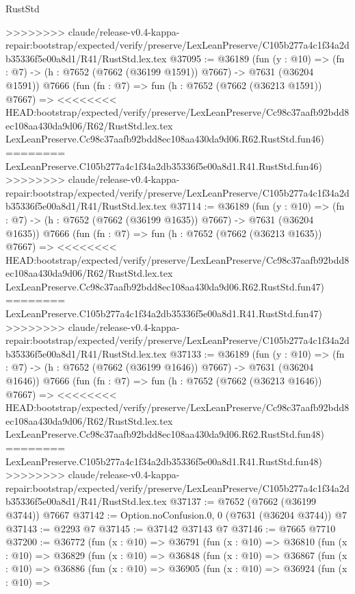 \begin{lexlean}{RustStd}
\begin{coremodule}
{\begin{coremodule}
{{{{{{{{{{{{{{{{{{{{{{{{{{{{{{{{{{{{{{{{{{{{{{{{{{{{{>>>>>>>> claude/release-v0.4-kappa-repair:bootstrap/expected/verify/preserve/LexLeanPreserve/C105b277a4c1f34a2db35336f5e00a8d1/R41/RustStd.lex.tex
@37095 := @36189
    (fun (y : @10) => (fn : @7) -> (h : @7652 (@7662 (@36199 @1591)) @7667) -> @7631 (@36204 @1591))
    @7666
    (fun (fn : @7) =>
    fun (h : @7652 (@7662 (@36213 @1591)) @7667) =>
<<<<<<<< HEAD:bootstrap/expected/verify/preserve/LexLeanPreserve/Cc98c37aafb92bdd8ec108aa430da9d06/R62/RustStd.lex.tex
    LexLeanPreserve.Cc98c37aafb92bdd8ec108aa430da9d06.R62.RustStd.fun46)
========
    LexLeanPreserve.C105b277a4c1f34a2db35336f5e00a8d1.R41.RustStd.fun46)
>>>>>>>> claude/release-v0.4-kappa-repair:bootstrap/expected/verify/preserve/LexLeanPreserve/C105b277a4c1f34a2db35336f5e00a8d1/R41/RustStd.lex.tex
@37114 := @36189
    (fun (y : @10) => (fn : @7) -> (h : @7652 (@7662 (@36199 @1635)) @7667) -> @7631 (@36204 @1635))
    @7666
    (fun (fn : @7) =>
    fun (h : @7652 (@7662 (@36213 @1635)) @7667) =>
<<<<<<<< HEAD:bootstrap/expected/verify/preserve/LexLeanPreserve/Cc98c37aafb92bdd8ec108aa430da9d06/R62/RustStd.lex.tex
    LexLeanPreserve.Cc98c37aafb92bdd8ec108aa430da9d06.R62.RustStd.fun47)
========
    LexLeanPreserve.C105b277a4c1f34a2db35336f5e00a8d1.R41.RustStd.fun47)
>>>>>>>> claude/release-v0.4-kappa-repair:bootstrap/expected/verify/preserve/LexLeanPreserve/C105b277a4c1f34a2db35336f5e00a8d1/R41/RustStd.lex.tex
@37133 := @36189
    (fun (y : @10) => (fn : @7) -> (h : @7652 (@7662 (@36199 @1646)) @7667) -> @7631 (@36204 @1646))
    @7666
    (fun (fn : @7) =>
    fun (h : @7652 (@7662 (@36213 @1646)) @7667) =>
<<<<<<<< HEAD:bootstrap/expected/verify/preserve/LexLeanPreserve/Cc98c37aafb92bdd8ec108aa430da9d06/R62/RustStd.lex.tex
    LexLeanPreserve.Cc98c37aafb92bdd8ec108aa430da9d06.R62.RustStd.fun48)
========
    LexLeanPreserve.C105b277a4c1f34a2db35336f5e00a8d1.R41.RustStd.fun48)
>>>>>>>> claude/release-v0.4-kappa-repair:bootstrap/expected/verify/preserve/LexLeanPreserve/C105b277a4c1f34a2db35336f5e00a8d1/R41/RustStd.lex.tex
@37137 := @7652 (@7662 (@36199 @3744)) @7667
@37142 := Option.noConfusion.{0, 0} (@7631 (@36204 @3744)) @7
@37143 := @2293 @7
@37145 := @37142 @37143 @7
@37146 := @7665 @7710
@37200 := @36772
    (fun (x : @10) =>
    @36791
      (fun (x : @10) =>
      @36810
        (fun (x : @10) =>
        @36829
          (fun (x : @10) =>
          @36848
            (fun (x : @10) =>
            @36867
              (fun (x : @10) =>
              @36886
                (fun (x : @10) =>
                @36905
                  (fun (x : @10) =>
                  @36924
                    (fun (x : @10) =>
}}}}}}}}}}}}}}}}}}}}}}}}}}}}}}}}}}}}}}}}}}}}}}}}}}}}}
\end{coremodule}}
\end{coremodule}
\end{lexlean}
